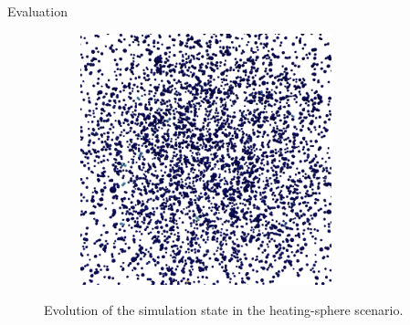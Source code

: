 \begin{frame}[c]{Evaluation}{}
{\begin{figure}[htpb]
\begin{subfigure}{.25\textwidth}
			\end{subfigure}%
			\begin{subfigure}{.25\textwidth}
				\vspace*{0.1\textwidth}
				\centering
				\includegraphics[width=0.8\textwidth]{heating-sphere/render/t60000.png}
				\vspace*{0.1\textwidth}
			\end{subfigure}%
			\vspace{-0.3cm}
			\caption{Evolution of the simulation state in the heating-sphere scenario.}
		\end{figure}
	}
\end{frame}

